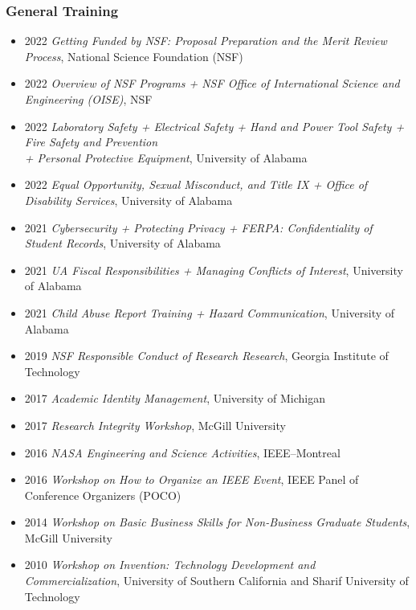 \documentclass{article}
\begin{document}
\subsubsection*{General Training}
\vspace{-6pt}
\begin{itemize}
\setlength\itemsep{-2 pt}
\setlength{\itemindent}{-25 pt} 
\item[] 2022 {\textit{Getting Funded by NSF: Proposal Preparation and the Merit Review Process}, \hfill National Science Foundation (NSF)}
\item[] 2022 {\textit{Overview of NSF Programs + NSF Office of International Science and Engineering (OISE)}, \hfill NSF}
\item[] 2022 {\textit{Laboratory Safety + Electrical Safety + Hand and Power Tool Safety + Fire Safety and Prevention \\ + Personal Protective Equipment}, \hfill University of Alabama}
\item[] 2022 {\textit{Equal Opportunity, Sexual Misconduct, and Title IX + Office of Disability Services}, \hfill University of Alabama}
\item[] 2021 {\textit{Cybersecurity + Protecting Privacy + FERPA: Confidentiality of Student Records}, \hfill University of Alabama}
\item[] 2021 {\textit{UA Fiscal Responsibilities + Managing Conflicts of Interest}, \hfill University of Alabama}
\item[] 2021 {\textit{Child Abuse Report Training + Hazard Communication}, \hfill University of Alabama}
\item[] 2019 {\textit{NSF Responsible Conduct of Research Research}, \hfill Georgia Institute of Technology}
\item[] 2017 {\textit{Academic Identity Management}, \hfill University of Michigan}
\item[] 2017 {\textit{Research Integrity Workshop}, \hfill McGill University}
\item[] 2016 {\textit{NASA Engineering and Science Activities}, \hfill IEEE--Montreal}
\item[] 2016 {\textit{Workshop on How to Organize an IEEE Event}, \hfill IEEE Panel of Conference Organizers (POCO)}
\item[] 2014 {\textit{Workshop on Basic Business Skills for Non-Business Graduate Students}, \hfill McGill University}
\item[] 2010 {\textit{Workshop on Invention: Technology Development and Commercialization}, \newline \phantom{f}  \hfill University of Southern California and Sharif University of Technology}
\end{itemize}
\end{document}
